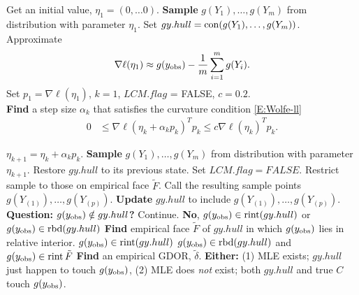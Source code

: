 {\singlespacing 
{ 
\noindent \begin{algorithmic}
\State Get an initial value, $\eta_1 = (0, \ldots 0)$.
\State \textbf{Sample} $g(Y_1), \ldots, g(Y_m)$ from distribution with parameter $\eta_{1}$.  
\State Set $gy.hull = \operatorname{con}(g(Y_1), \ldots, g(Y_m) )$.
\State Approximate 
\begin{align*}
\nabla \ell( \eta_1) \approx g(y_{\text{obs}}) - \frac{1}{m}\sum_{i=1}^m g(Y_i).
\end{align*}
\State Set $p_1 = \nabla \ell( \eta_1)$, $k=1$, $LCM.flag$ = FALSE, $c=0.2$.\\

\State \textbf{Find} a step size $\alpha_k$ that satisfies the curvature condition \eqref{E:Wolfe-ll}
\begin{align*}%
	 0 & \leq \nabla \ell( \eta_k + \alpha_k p_k)^T p_k \leq c \nabla \ell(\eta_k)^T p_k.
\end{align*}

\State $\eta_{k+1} = \eta_k + \alpha_k p_k$.
\State \textbf{Sample} $g(Y_1), \ldots, g(Y_m)$ from distribution with parameter $\eta_{k+1}$.
		\State Restore $gy.hull$ to its previous state.
		\State Set $LCM.flag = FALSE$.
	\Else
		\State Restrict sample to those on empirical face $\tilde{F}$.
	\EndIf
\EndIf
\State Call the resulting sample points $g(Y_{(1)}), \ldots, g(Y_{(p)})$.
\State \textbf{Update} $gy.hull$ to include $g(Y_{(1)}), \ldots, g(Y_{(p)}) $.\\
\State \textbf{Question: $g(y_{\text{obs}}) \notin gy.hull$?}
	\State  Continue.
\Else
\State \textbf{No}, $g(y_{\text{obs}}) \in \operatorname{rint}(gy.hull)$ or $g(y_{\text{obs}}) \in \operatorname{rbd}(gy.hull)$
	\State \textbf{Find} empirical face $\tilde{F}$ of $gy.hull$ in which $g(y_{\text{obs}})$ 
	lies in relative interior.
		\State $g(y_{\text{obs}}) \in \operatorname{rint}( gy.hull )$ 
	\Else
	\State $g(y_{\text{obs}}) \in \operatorname{rbd}( gy.hull )$ and $g(y_{\text{obs}}) \in \operatorname{rint} \tilde{F}$
		\State \textbf{Find} an empirical GDOR, $\tilde{\delta}$.
		\State \textbf{Either:}
		\State (1) MLE exists; $gy.hull$ just happen to touch $g(y_{\text{obs}})$, 
		\State (2) MLE does \emph{not} exist; both $gy.hull$ and true $C$
		touch $g(y_{\text{obs}})$.


\end{algorithmic}}}
